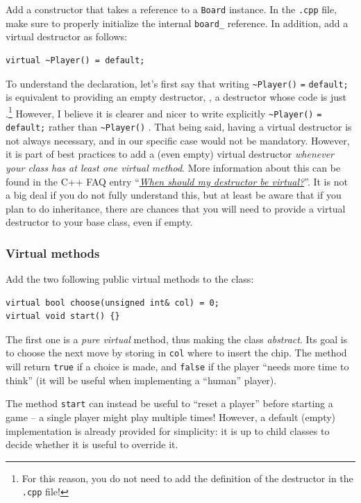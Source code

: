 \documentclass{article}
\begin{document}
Add a constructor that takes a reference to a \texttt{Board} instance. In the \texttt{.cpp} file, make sure to properly initialize the internal \texttt{board\string_} reference. In addition, add a virtual destructor as follows:
\begin{lstlisting}[style=mycpp,numbers=none]
virtual ~Player() = default;
\end{lstlisting}
To understand the declaration, let's first say that writing \texttt{\textasciitilde Player()} \texttt{=} \texttt{default;} is equivalent to providing an empty destructor, \ie, a destructor whose code is just \texttt{\string{\string}}.\footnote{For this reason, you do not need to add the definition of the destructor in the \texttt{.cpp} file!} However, I believe it is clearer and nicer to write explicitly \texttt{\textasciitilde Player()} \texttt{=} \texttt{default;} rather than \texttt{\textasciitilde Player()} \texttt{\string{\string}}. That being said, having a virtual destructor is not always necessary, and in our specific case would not be mandatory. However, it is part of best practices to add a (even empty) virtual destructor \emph{whenever your class has at least one virtual method}. More information about this can be found in the C++ FAQ entry ``\href{https://isocpp.org/wiki/faq/virtual-functions#virtual-dtors}{\emph{When should my destructor be virtual?}}''. It is not a big deal if you do not fully understand this, but at least be aware that if you plan to do inheritance, there are chances that you will need to provide a virtual destructor to your base class, even if empty.


\subsubsection{Virtual methods}

Add the two following public virtual methods to the class:
\begin{lstlisting}[style=mycpp,numbers=none]
virtual bool choose(unsigned int& col) = 0;
virtual void start() {}
\end{lstlisting}
The first one is a \emph{pure virtual} method, thus making the class \emph{abstract}. Its goal is to choose the next move by storing in \texttt{col} where to insert the chip. The method will return \texttt{true} if a choice is made, and \texttt{false} if the player ``needs more time to think'' (it will be useful when implementing a ``human'' player).

The method \texttt{start} can instead be useful to ``reset a player'' before starting a game -- a single player might play multiple times! However, a default (empty) implementation is already provided for simplicity: it is up to child classes to decide whether it is useful to override it.
\end{document}

